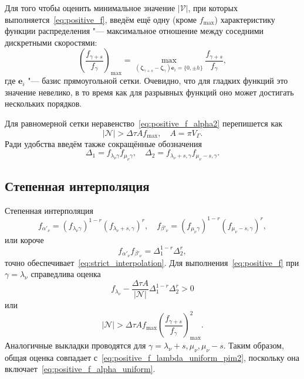\documentclass[a4paper,12pt]{article}
\newcommand{\bzeta}{\boldsymbol{\zeta}}
\newcommand{\be}{\boldsymbol{e}}
\newcommand{\Nu}{\mathcal{N}}
\begin{document}
Для того чтобы оценить минимальное значение \(|\mathcal{V}|\), при которых выполняется~\eqref{eq:positive_f},
введём ещё одну (кроме \(f_{\max}\)) характеристику функции распределения "---
максимальное отношение между соседними дискретными скоростями:
\begin{equation}\label{eq:max_f_ratio_uniform}
    \left(\frac{f_{\gamma+s}}{f_\gamma}\right)_{\max} =
       \max_{(\bzeta_{\gamma+s}-\bzeta_{\gamma})\be_i = \{0,\pm{h}\}} \frac{f_{\gamma+s}}{f_\gamma},
\end{equation}
где \(\be_i\) "--- базис прямоугольной сетки.
Очевидно, что для гладких функций это значение невелико,
в то время как для разрывных функций оно может достигать нескольких порядков.

Для равномерной сетки неравенство~\eqref{eq:positive_f_alpha2} перепишется как
\begin{equation}\label{eq:positive_f_alpha_uniform}
   |\Nu| > \Delta\tau A f_{\max}, \quad A = \pi V_\Gamma.
\end{equation}
Ради удобства введём также сокращённые обозначения
\begin{equation}\label{eq:uniform_deltas}
    \Delta_1 = f_{\lambda_\nu\gamma}f_{\mu_\nu\gamma}, \quad
    \Delta_2 = f_{\lambda_\nu+s,\gamma}f_{\mu_\nu-s,\gamma}.
\end{equation}

\subsection{Степенная интерполяция}

Степенная интерполяция
\begin{equation}\label{eq:uniform_pim}
    f_{\alpha'_\nu} = \left(f_{\lambda_\nu\gamma}\right)^{1-r} \left(f_{\lambda_\nu+s,\gamma}\right)^r, \quad
    f_{\beta'_\nu} = \left(f_{\mu_\nu\gamma}\right)^{1-r} \left(f_{\mu_\nu-s,\gamma}\right)^r,
\end{equation}
или короче
\begin{equation}\label{eq:uniform_pim2}
    f_{\alpha'_\nu}f_{\beta'_\nu} = \Delta_1^{1-r} \Delta_2^r,
\end{equation}
точно обеспечивает~\eqref{eq:strict_interpolation}.
Для выполнения~\eqref{eq:positive_f} при \(\gamma = \lambda_\nu\) справедлива оценка
\begin{equation}\label{eq:positive_f_lambda_uniform_pim}
   f_{\lambda_\nu} - \frac{\Delta\tau A}{|\Nu|} \Delta_1^{1-r} \Delta_2^r > 0
\end{equation}
или
\begin{equation}\label{eq:positive_f_lambda_uniform_pim2}
   |\Nu| > \Delta\tau A f_{\max} \left(\frac{f_{\gamma+s}}{f_\gamma}\right)_{\max}^2.
\end{equation}
Аналогичные выкладки проводятся для \(\gamma = \lambda_\nu+s, \mu_\nu, \mu_\nu-s\).
Таким образом, общая оценка совпадает с~\eqref{eq:positive_f_lambda_uniform_pim2},
поскольку она включает~\eqref{eq:positive_f_alpha_uniform}.
\end{document}
